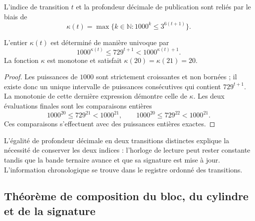 \begin{definition}
L'indice de transition \(t\) et la profondeur décimale de publication sont reliés par le biais de
\begin{equation}
 \kappa(t)=\max\{k\in\mathbb N:1000^k\leq3^{6(t+1)}\}.
 \label{eq:df-reloj}
\end{equation}
\end{definition}

\begin{proposition}
\label{prop:df-reloj}
L'entier \(\kappa(t)\) est déterminé de manière univoque par
\begin{equation}
 1000^{\kappa(t)}\leq729^{t+1}<1000^{\kappa(t)+1}.
 \label{eq:df-reloj-cotas}
\end{equation}
La fonction \(\kappa\) est monotone et satisfait
\(\kappa(20)=\kappa(21)=20\).
\end{proposition}

\begin{proof}
Les puissances de \(1000\) sont strictement croissantes et non bornées ;
il existe donc un unique intervalle de puissances consécutives qui
contient \(729^{t+1}\). La monotonie de cette dernière expression démontre
celle de \(\kappa\). Les deux évaluations finales sont les comparaisons
entières
\[
 1000^{20}\leq729^{21}<1000^{21},\qquad
 1000^{20}\leq729^{22}<1000^{21}.
\]
Ces comparaisons s'effectuent avec des puissances entières exactes.
\end{proof}

L'égalité de profondeur décimale en deux transitions distinctes explique la nécessité de conserver les deux indices : l'horloge de lecture peut rester constante tandis que la bande ternaire avance et que sa signature est mise à jour. L'information chronologique se trouve dans le registre ordonné des transitions.

\subsection{Théorème de composition du bloc, du cylindre et de la signature}

